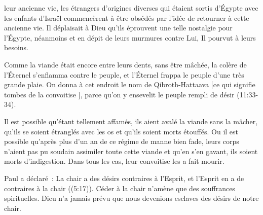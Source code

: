 

 leur ancienne vie,
 les étrangers d'origines diverses qui étaient sortis d'Égypte
 avec les enfants d'Israël commencèrent à être obsédés
 par l'idée de retourner à cette ancienne vie.
 Il déplaisait à Dieu qu'ils éprouvent une telle nostalgie pour l'Égypte,
 néanmoins et en dépit de leurs murmures contre Lui, Il pourvut à leurs besoins.

\og Comme la viande était encore entre leurs dents, sans être mâchée,
 la colère de l'Éternel s'enflamma contre le peuple, et l'Éternel
 frappa le peuple d'une très grande plaie.
 On donna à cet endroit le nom de Qibroth-Hattaava
 [ce qui signifie \og tombes de la convoitise \fg{}],
 parce qu'on y ensevelit le peuple rempli de désir \fg{} (11:33-34).

Il est possible qu'étant tellement affamés,
 ils aient avalé la viande sans la mâcher,
 qu'ils se soient étranglés avec les os et qu'ils soient morts étouffés.
 Ou il est possible qu'après plus d'un an de ce régime de manne bien fade,
 leurs corps n'aient pas pu soudain assimiler toute cette viande
 et qu'en s'en gavant, ils soient morts d'indigestion.
 Dans tous les cas, leur convoitise les a fait mourir.


Paul a déclaré~:
 \og La chair a des désirs contraires à l'Esprit,
 et l'Esprit en a de contraires à la chair \fg{} ((5:17)).
 Céder à la chair n'amène que des souffrances spirituelles.
 Dieu n'a jamais prévu que nous devenions esclaves des désirs de notre chair.

\dvrule






